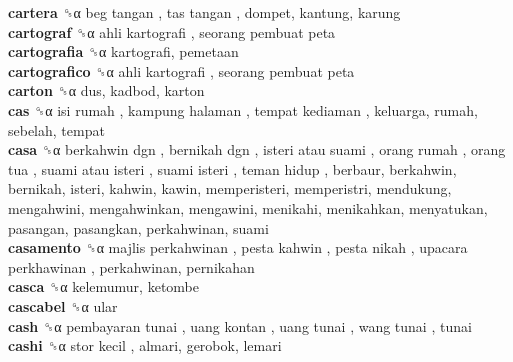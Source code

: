 \textbf{cartera} ␝α   beg tangan ,  tas tangan , dompet, kantung, karung  \\
\textbf{cartograf} ␝α   ahli kartografi ,  seorang pembuat peta   \\
\textbf{cartografia} ␝α  kartografi, pemetaan  \\
\textbf{cartografico} ␝α   ahli kartografi ,  seorang pembuat peta   \\
\textbf{carton} ␝α  dus, kadbod, karton  \\
\textbf{cas} ␝α   isi rumah ,  kampung halaman ,  tempat kediaman , keluarga, rumah, sebelah, tempat  \\
\textbf{casa} ␝α   berkahwin dgn ,  bernikah dgn ,  isteri atau suami ,  orang rumah ,  orang tua ,  suami atau isteri ,  suami isteri ,  teman hidup , berbaur, berkahwin, bernikah, isteri, kahwin, kawin, memperisteri, memperistri, mendukung, mengahwini, mengahwinkan, mengawini, menikahi, menikahkan, menyatukan, pasangan, pasangkan, perkahwinan, suami  \\
\textbf{casamento} ␝α   majlis perkahwinan ,  pesta kahwin ,  pesta nikah ,  upacara perkhawinan , perkahwinan, pernikahan  \\
\textbf{casca} ␝α  kelemumur, ketombe  \\
\textbf{cascabel} ␝α  ular  \\
\textbf{cash} ␝α   pembayaran tunai ,  uang kontan ,  uang tunai ,  wang tunai , tunai  \\
\textbf{cashi} ␝α   stor kecil , almari, gerobok, lemari  \\
